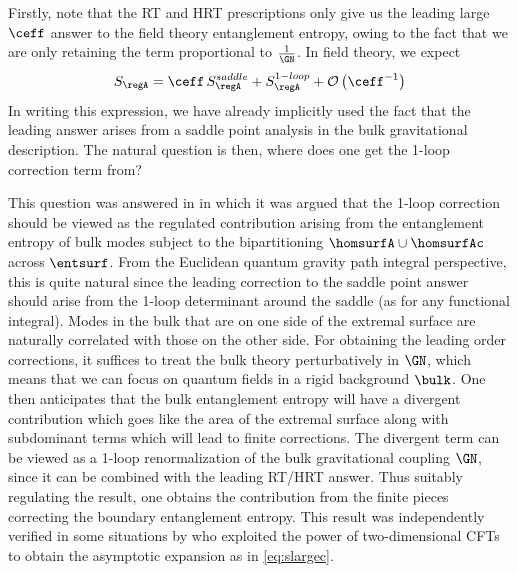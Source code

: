 \documentclass[12pt,openany]{book}
\begin{document}
Firstly, note that the RT and HRT prescriptions only give us the leading large $\ceff$ answer to the field theory entanglement entropy, owing to the fact that we are only retaining the term proportional to $\frac{1}{\GN}$. In field theory, we expect
%
\begin{equation}
S_\regA = \ceff\, S_\regA^{saddle} + S_\regA^{1-loop} + {\cal O}\left(\ceff^{-1} \right)
\label{eq:slargec}
\end{equation}
%
In writing this expression, we have already implicitly used the fact that the leading answer arises from a saddle point analysis in the bulk gravitational description. The natural question is then, where does one get the 1-loop correction term from?

This question was answered in \cite{Faulkner:2013ana} in which it was argued that the 1-loop correction should be viewed as the regulated contribution arising from the entanglement entropy of bulk modes subject to the bipartitioning $\homsurfA \cup \homsurfAc$ across $\entsurf$. From the Euclidean quantum gravity path integral perspective, this is quite natural since the leading correction to the saddle point answer should arise from the 1-loop determinant around the saddle (as for any functional integral). Modes in the bulk that are on one side of the extremal surface are naturally correlated with those on the other side. For obtaining the leading order corrections, it suffices to treat the bulk theory perturbatively in $\GN$, which means that we can focus on quantum fields in a rigid background $\bulk$. One then anticipates that the bulk entanglement entropy will have a divergent contribution which goes like the area of the extremal surface along with subdominant terms which will lead to finite corrections. The divergent term can be viewed as a 1-loop renormalization of the bulk gravitational coupling $\GN$, since it can be combined with the leading RT/HRT answer. Thus suitably regulating the result, one obtains the contribution from the finite pieces correcting the boundary entanglement entropy. This result was independently verified in some situations by \cite{Barrella:2013wja} who exploited the power of two-dimensional CFTs to obtain the asymptotic expansion as in \eqref{eq:slargec}.
\end{document}
